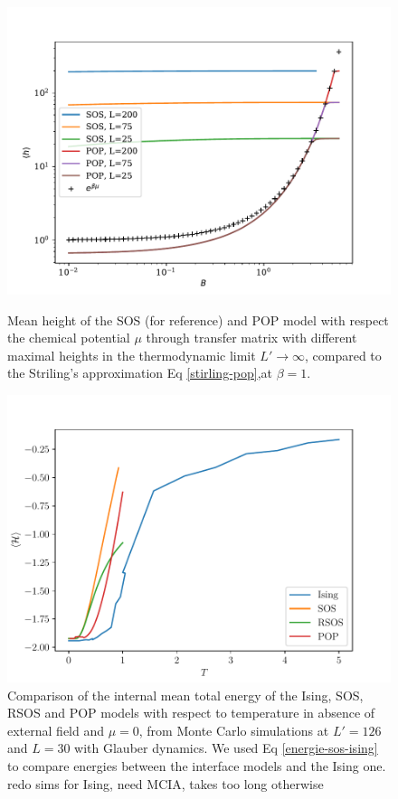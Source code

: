 \begin{figure}
\centering
\includegraphics{pop/hauteur-tm-pop-sos.pdf}
\caption{Mean height of the SOS (for reference) and POP model with respect the chemical potential $\mu$ through transfer matrix with different maximal heights in the thermodynamic limit $L'\to \infty$, compared to the Striling's approximation Eq \eqref{stirling-pop},at $\beta=1$. }
\label{haut-tm-pop} 
\includegraphics{pop/comparaison-modeles.pdf}
\caption{Comparison of the internal mean total energy of the Ising, SOS, RSOS and POP models with respect to temperature in absence of external field and $\mu=0$, from Monte Carlo simulations at $L'=126$ and $L=30$ with Glauber dynamics. We used Eq \ref{energie-sos-ising} to compare energies between the interface models and the Ising one.
{\color{red} redo sims for Ising, need MCIA, takes too long otherwise}}
\label{comp-models}
\end{figure}

